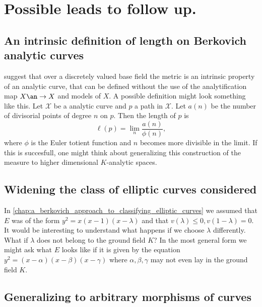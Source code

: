 
\section{Possible leads to follow up.} \label{sec:possible_leads_to_follow_up}

\subsection{An intrinsic definition of length on Berkovich analytic curves} \label{sec:an_intrinsic_definition_of_length_on_berkovich_analytic_curves}

 suggest that over a discretely valued base field the metric is an intrinsic property of an analytic curve, that can be defined without the use of the analytification map $X\an \to X$ and models of $X$. 
A possible definition might look something like this. 
Let $\mathcal{X} $ be a analytic curve and $p$ a path in $\mathcal X$. 
Let $a(n)$ be the number of divisorial points of degree $n$ on $p$. 
Then the length of $p$ is \[
	\ell(p) = \lim_{n} \frac{a(n)}{\phi(n)}
,\] 
where $\phi$ is the Euler totient function and $n$ becomes more divisible in the limit. 
If this is succesfull, one might think about generalizing this construction of the measure to higher dimensional $K$-analytic spaces. 

\subsection{Widening the class of elliptic curves considered} \label{sec:widening_the_class_of_elliptic_curves_considered}

In \cref{chap:a_berkovich_approach_to_classifying_elliptic_curves} we assumed that $E$ was of the form $y^2 = x(x-1)(x-\lambda)$ and that $v(\lambda) \le 0, v(1-\lambda) = 0$. 
It would be interesting to understand what happens if we choose $\lambda$ differently. 
What if $\lambda$ does not belong to the ground field $K$?
In the most general form we might ask what $E$ looks like if it is given by the equation $y^2 = (x-\alpha)(x-\beta)(x-\gamma)$ where $\alpha, \beta, \gamma$ may not even lay in the ground field $K$. 

\subsection{Generalizing to arbitrary morphisms of curves} \label{sec:generalizing_to_arbitrary_morphisms_of_curves}

